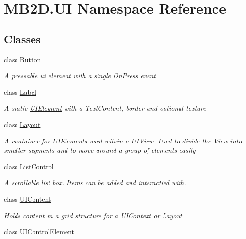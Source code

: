 \hypertarget{namespace_m_b2_d_1_1_u_i}{}\section{M\+B2\+D.\+UI Namespace Reference}
\label{namespace_m_b2_d_1_1_u_i}
\subsection*{Classes}
\begin{DoxyCompactItemize}
\item 
class \hyperlink{class_m_b2_d_1_1_u_i_1_1_button}{Button}
\begin{DoxyCompactList}\small\item\em A pressable ui element with a single On\+Press event \end{DoxyCompactList}\item 
class \hyperlink{class_m_b2_d_1_1_u_i_1_1_label}{Label}
\begin{DoxyCompactList}\small\item\em A static \hyperlink{class_m_b2_d_1_1_u_i_1_1_u_i_element}{U\+I\+Element} with a Text\+Content, border and optional texture \end{DoxyCompactList}\item 
class \hyperlink{class_m_b2_d_1_1_u_i_1_1_layout}{Layout}
\begin{DoxyCompactList}\small\item\em A container for U\+I\+Elements used within a \hyperlink{class_m_b2_d_1_1_u_i_1_1_u_i_view}{U\+I\+View}. Used to divide the View into smaller segments and to move around a group of elements easily \end{DoxyCompactList}\item 
class \hyperlink{class_m_b2_d_1_1_u_i_1_1_list_control}{List\+Control}
\begin{DoxyCompactList}\small\item\em A scrollable list box. Items can be added and interactied with. \end{DoxyCompactList}\item 
class \hyperlink{class_m_b2_d_1_1_u_i_1_1_u_i_content}{U\+I\+Content}
\begin{DoxyCompactList}\small\item\em Holds content in a grid structure for a U\+I\+Context or \hyperlink{class_m_b2_d_1_1_u_i_1_1_layout}{Layout} \end{DoxyCompactList}\item 
class \hyperlink{class_m_b2_d_1_1_u_i_1_1_u_i_control_element}{U\+I\+Control\+Element}

\end{DoxyCompactItemize}
